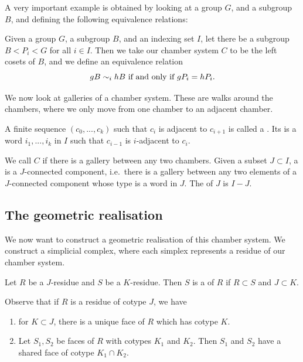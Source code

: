\documentclass[11pt]{article}
\begin{document}
A very important example is obtained by looking at a group $G$, and a subgroup $B$, and defining the following equivalence relations: 

\begin{example}
    Given a group $G$, a subgroup $B$, and an indexing set $I$, let there be a subgroup $B<P_i<G$ for all $i\in I$. Then we take our chamber system $C$ to be the left cosets of $B$, and we define an equivalence relation
    \[gB\sim_{i}hB \textnormal{ if and only if }gP_i=hP_i.\]
\end{example}

We now look at galleries of a chamber system. These are walks around the chambers, where we only move from one chamber to an adjacent chamber. 

\begin{definition}
    A finite sequence $(c_0,...,c_k)$ such that $c_i$ is adjacent to $c_{i+1}$ is called a . Its  is a word $i_1,...,i_k$ in $I$ such that  $c_{i-1}$ is $i$-adjacent to $c_{i}$. 
\end{definition}

\begin{definition}
    We call $C$  if there is a gallery between any two chambers. Given a subset $J\subset I$, a  is a $J$-connected component, i.e.\ there is a gallery between any two elements of a $J$-connected component whose type is a word in $J$. The  of $J$ is $I-J$. 
\end{definition}


\subsection{The geometric realisation}

We now want to construct a geometric realisation of this chamber system. We construct a simplicial complex, where each simplex represents a residue of our chamber system.

\begin{definition}
    Let $R$ be a $J$-residue and $S$ be a $K$-residue. Then $S$ is a  of $R$ if $R\subset S$ and $J\subset K$. 
\end{definition}

Observe that if $R$ is a residue of cotype $J$, we have
\begin{enumerate}
    \item for $K\subset J$, there is a unique face of $R$ which has cotype $K$.
    \item Let $S_1,S_2$ be faces of $R$ with cotypes $K_1$ and $K_2$. Then $S_1$ and $S_2$ have a shared face of cotype $K_1\cap K_2$. 
\end{enumerate}
\end{document}

